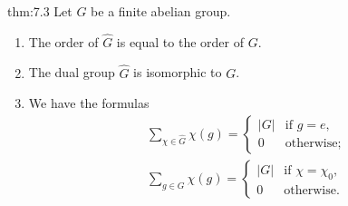 \begin{theo}{thm:7.3}
    Let $G$ be a finite abelian group. 
    \begin{enumerate}[(1)]
        \item The order of $\hat G$ is equal to the order of $G$. 
        \item The dual group $\hat G$ is isomorphic to $G$. 
        \item We have the formulas 
        \begin{align*}
            \sum_{\chi\in\hat G} \chi(g) = \begin{cases}
                |G| & \text{if } g = e, \\ 
                0 & \text{otherwise;}
            \end{cases} \\ 
            \sum_{g\in G} \chi(g) = \begin{cases} 
                |G| & \text{if } \chi = \chi_0, \\ 
                0 & \text{otherwise.}
            \end{cases}
        \end{align*}
    \end{enumerate}
\end{theo}
